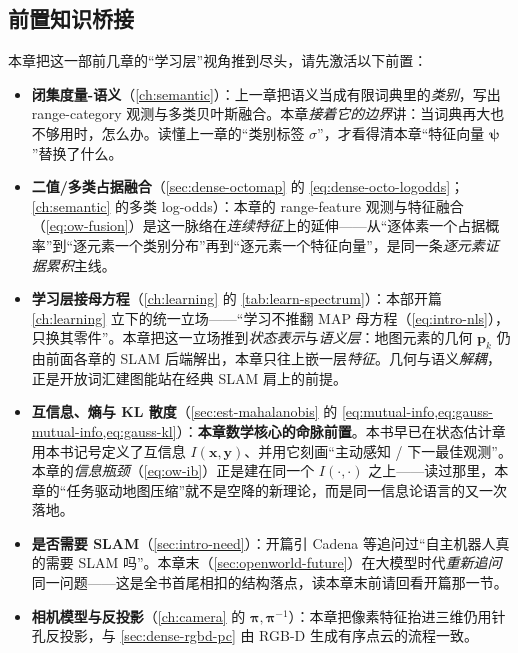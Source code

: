 \subsection*{前置知识桥接}
本章把这一部前几章的“学习层”视角推到尽头，请先激活以下前置：
\begin{itemize}
  \item \textbf{闭集度量-语义}（\cref{ch:semantic}）：上一章把语义当成有限词典里的\emph{类别}，写出 range-category 观测与多类贝叶斯融合。本章\emph{接着它的边界}讲：当词典再大也不够用时，怎么办。读懂上一章的“类别标签 $\sigma$”，才看得清本章“特征向量 $\boldsymbol\psi$”替换了什么。
  \item \textbf{二值/多类占据融合}（\cref{sec:dense-octomap} 的 \cref{eq:dense-octo-logodds}；\cref{ch:semantic} 的多类 log-odds）：本章的 range-feature 观测与特征融合（\cref{eq:ow-fusion}）是这一脉络在\emph{连续特征}上的延伸——从“逐体素一个占据概率”到“逐元素一个类别分布”再到“逐元素一个特征向量”，是同一条\emph{逐元素证据累积}主线。
  \item \textbf{学习层接母方程}（\cref{ch:learning} 的 \cref{tab:learn-spectrum}）：本部开篇 \cref{ch:learning} 立下的统一立场——“学习不推翻 MAP 母方程（\cref{eq:intro-nls}），只换其零件”。本章把这一立场推到\emph{状态表示}与\emph{语义层}：地图元素的几何 $\mathbf{p}_k$ 仍由前面各章的 SLAM 后端解出，本章只往上嵌一层\emph{特征}。几何与语义\emph{解耦}，正是开放词汇建图能站在经典 SLAM 肩上的前提。
  \item \textbf{互信息、熵与 KL 散度}（\cref{sec:est-mahalanobis} 的 \cref{eq:mutual-info,eq:gauss-mutual-info,eq:gauss-kl}）：\textbf{本章数学核心的命脉前置}。本书早已在状态估计章用本书记号定义了互信息 $I(\mathbf{x},\mathbf{y})$、并用它刻画“主动感知 / 下一最佳观测”。本章的\emph{信息瓶颈}（\cref{eq:ow-ib}）正是建在同一个 $I(\cdot,\cdot)$ 之上——读过那里，本章的“任务驱动地图压缩”就不是空降的新理论，而是同一信息论语言的又一次落地。
  \item \textbf{是否需要 SLAM}（\cref{sec:intro-need}）：开篇引 Cadena 等追问过“自主机器人真的需要 SLAM 吗”。本章末（\cref{sec:openworld-future}）在大模型时代\emph{重新追问}同一问题——这是全书首尾相扣的结构落点，读本章末前请回看开篇那一节。
  \item \textbf{相机模型与反投影}（\cref{ch:camera} 的 $\boldsymbol\pi,\boldsymbol\pi^{-1}$）：本章把像素特征抬进三维仍用针孔反投影，与 \cref{sec:dense-rgbd-pc} 由 RGB-D 生成有序点云的流程一致。
\end{itemize}


